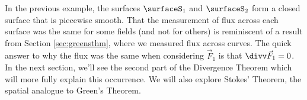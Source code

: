 In the previous example, the surfaces $\surfaceS_1$ and $\surfaceS_2$ form a closed surface that is piecewise smooth. That the measurement of flux across each surface was the same for some fields (and not for others) is reminiscent of a result from Section \ref{sec:greensthm}, where we measured flux across curves. The quick answer to why the flux was the same when considering $\vec F_1$ is that $\divv \vec F_1 = 0$. In the next section, we'll see the second part of the Divergence Theorem which will more fully explain this occurrence. We will also explore Stokes' Theorem, the spatial analogue to Green's Theorem.

